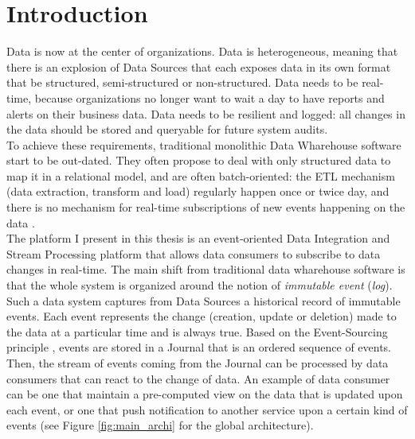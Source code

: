 \chapter{Introduction}

Data is now at the center of organizations. 
Data is heterogeneous, meaning that there is an explosion of Data Sources that each exposes data in its own format 
that be structured, semi-structured or non-structured.
Data needs to be real-time, because organizations no longer want to wait a day to have reports and alerts on their business data.
Data needs to be resilient and logged: all changes in the data should be stored and queryable for future system audits.
\\

To achieve these requirements, traditional monolithic Data Wharehouse software start to be out-dated. They often
propose to deal with only structured data to map it in a relational model, and are often batch-oriented: 
the ETL mechanism (data extraction, transform and load) regularly happen once or twice day, and there is no mechanism 
for real-time subscriptions of new events happening on the data .
\\

The platform I present in this thesis is an event-oriented Data Integration and Stream Processing platform that allows data consumers
to subscribe to data changes in real-time. The main shift from traditional data wharehouse software is that the whole
system is organized around the notion of \textit{immutable event} (\textit{log}). Such a data system captures from Data Sources
a historical record of immutable events. Each event represents the change (creation, update or deletion) made to the data at a particular time and 
is always true. Based on the Event-Sourcing principle , events are stored in a Journal that is an ordered sequence of 
events. Then, the stream of events coming from the Journal can be processed by data consumers that can react to the change of data. 
An example of data consumer can be one that maintain a pre-computed view on the data that is updated upon each event, or one that push 
notification to another service upon a certain kind of events (see Figure \ref{fig:main_archi} for the global architecture).
\\

